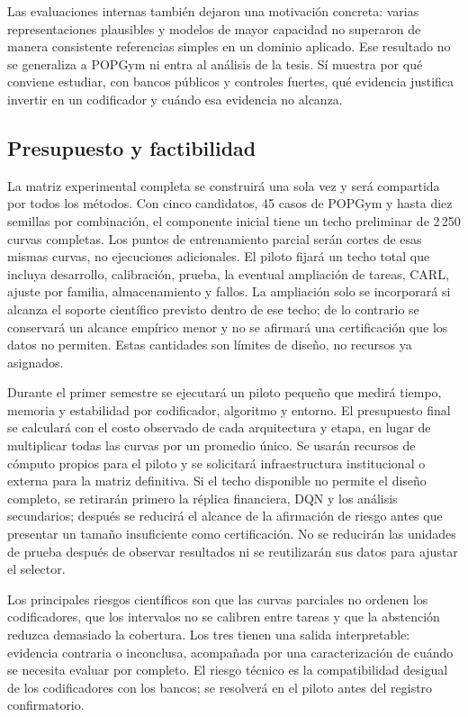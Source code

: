 \documentclass[11pt,letterpaper]{article}
\begin{document}
Las evaluaciones internas también dejaron una motivación concreta: varias representaciones plausibles y modelos de mayor capacidad no superaron de manera consistente referencias simples en un dominio aplicado.
Ese resultado no se generaliza a POPGym ni entra al análisis de la tesis.
Sí muestra por qué conviene estudiar, con bancos públicos y controles fuertes, qué evidencia justifica invertir en un codificador y cuándo esa evidencia no alcanza.

\subsection{Presupuesto y factibilidad}

La matriz experimental completa se construirá una sola vez y será compartida por todos los métodos.
Con cinco candidatos, 45 casos de POPGym y hasta diez semillas por combinación, el componente inicial tiene un techo preliminar de 2\,250 curvas completas.
Los puntos de entrenamiento parcial serán cortes de esas mismas curvas, no ejecuciones adicionales.
El piloto fijará un techo total que incluya desarrollo, calibración, prueba, la eventual ampliación de tareas, CARL, ajuste por familia, almacenamiento y fallos.
La ampliación solo se incorporará si alcanza el soporte científico previsto dentro de ese techo; de lo contrario se conservará un alcance empírico menor y no se afirmará una certificación que los datos no permiten.
Estas cantidades son límites de diseño, no recursos ya asignados.

Durante el primer semestre se ejecutará un piloto pequeño que medirá tiempo, memoria y estabilidad por codificador, algoritmo y entorno.
El presupuesto final se calculará con el costo observado de cada arquitectura y etapa, en lugar de multiplicar todas las curvas por un promedio único.
Se usarán recursos de cómputo propios para el piloto y se solicitará infraestructura institucional o externa para la matriz definitiva.
Si el techo disponible no permite el diseño completo, se retirarán primero la réplica financiera, DQN y los análisis secundarios; después se reducirá el alcance de la afirmación de riesgo antes que presentar un tamaño insuficiente como certificación.
No se reducirán las unidades de prueba después de observar resultados ni se reutilizarán sus datos para ajustar el selector.

Los principales riesgos científicos son que las curvas parciales no ordenen los codificadores, que los intervalos no se calibren entre tareas y que la abstención reduzca demasiado la cobertura.
Los tres tienen una salida interpretable: evidencia contraria o inconclusa, acompañada por una caracterización de cuándo se necesita evaluar por completo.
El riesgo técnico es la compatibilidad desigual de los codificadores con los bancos; se resolverá en el piloto antes del registro confirmatorio.
\end{document}
